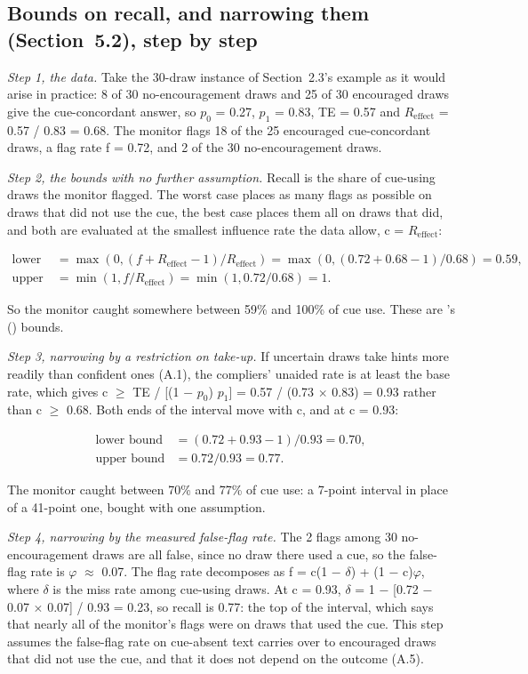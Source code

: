 \documentclass[11pt,a4paper]{article}
\begin{document}
\subsection{Bounds on recall, and narrowing them (Section~5.2), step by step}
\emph{Step 1, the data.} Take the 30-draw instance of Section~2.3’s example as it would arise in practice: 8 of 30 no-encouragement draws and 25 of 30 encouraged draws give the cue-concordant answer, so $p_0$ = 0.27, $p_1$ = 0.83, TE = 0.57 and $R_{\mathrm{effect}}$ = 0.57 / 0.83 = 0.68. The monitor flags 18 of the 25 encouraged cue-concordant draws, a flag rate f = 0.72, and 2 of the 30 no-encouragement draws.

\emph{Step 2, the bounds with no further assumption.} Recall is the share of cue-using draws the monitor flagged. The worst case places as many flags as possible on draws that did not use the cue, the best case places them all on draws that did, and both are evaluated at the smallest influence rate the data allow, c = $R_{\mathrm{effect}}$:

\begin{align*}
  \text{lower bound} &= \max(0, (f + R_{\mathrm{effect}} - 1) / R_{\mathrm{effect}}) = \max(0, (0.72 + 0.68 - 1) / 0.68) = 0.59, \\
  \text{upper bound} &= \min(1, f / R_{\mathrm{effect}}) = \min(1, 0.72 / 0.68) = 1.
\end{align*}

So the monitor caught somewhere between 59\% and 100\% of cue use. These are \citeauthor*{guan2026beyond}’s (\citeyear{guan2026beyond}) bounds.

\emph{Step 3, narrowing by a restriction on take-up.} If uncertain draws take hints more readily than confident ones (A.1), the compliers’ unaided rate is at least the base rate, which gives c $\geq$ TE / [(1 $-$ $p_0$) $p_1$] = 0.57 / (0.73 $\times$ 0.83) = 0.93 rather than c $\geq$ 0.68. Both ends of the interval move with c, and at c = 0.93:

\begin{align*}
  \text{lower bound} &= (0.72 + 0.93 - 1) / 0.93 = 0.70, \\
  \text{upper bound} &= 0.72 / 0.93 = 0.77.
\end{align*}

The monitor caught between 70\% and 77\% of cue use: a 7-point interval in place of a 41-point one, bought with one assumption.

\emph{Step 4, narrowing by the measured false-flag rate.} The 2 flags among 30 no-encouragement draws are all false, since no draw there used a cue, so the false-flag rate is $\varphi$ $\approx$ 0.07. The flag rate decomposes as f = c(1 $-$ $\delta$) + (1 $-$ c)$\varphi$, where $\delta$ is the miss rate among cue-using draws. At c = 0.93, $\delta$ = 1 $-$ [0.72 $-$ 0.07 $\times$ 0.07] / 0.93 = 0.23, so recall is 0.77: the top of the interval, which says that nearly all of the monitor’s flags were on draws that used the cue. This step assumes the false-flag rate on cue-absent text carries over to encouraged draws that did not use the cue, and that it does not depend on the outcome (A.5).
\end{document}
